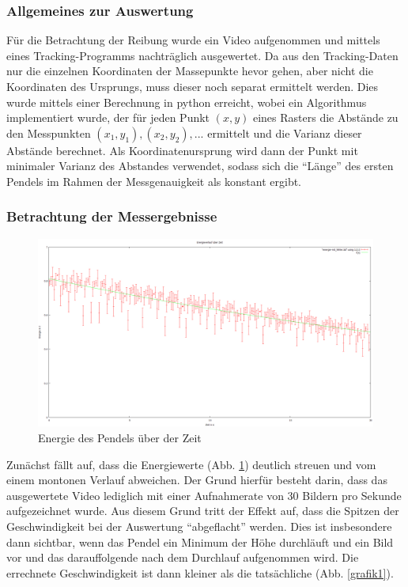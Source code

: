 \subsubsection{Allgemeines zur Auswertung}
Für die Betrachtung der Reibung wurde ein Video aufgenommen und mittels eines Tracking-Programms nachträglich ausgewertet. 
Da aus den Tracking-Daten nur die einzelnen Koordinaten der Massepunkte hevor gehen, aber nicht die Koordinaten des Ursprungs, muss dieser noch separat ermittelt werden. Dies wurde mittels einer Berechnung in python erreicht, wobei ein Algorithmus implementiert wurde, der für jeden Punkt $(x, y)$ eines Rasters die Abstände zu den Messpunkten $(x_1, y_1), (x_2, y_2), ...$ ermittelt und die Varianz dieser Abstände berechnet. Als Koordinatenursprung wird dann der Punkt mit minimaler Varianz des Abstandes verwendet, sodass sich die \enquote{Länge} des ersten Pendels im Rahmen der Messgenauigkeit als konstant ergibt.  

\subsubsection{Betrachtung der Messergebnisse}


\begin{figure}
        \includegraphics[width=.9\textwidth]{images/E_ueber_t.png}
\caption{Energie des Pendels über der Zeit}
\label{E_ueber_t}
\end{figure}

Zunächst fällt auf, dass die Energiewerte (Abb. \ref{E_ueber_t}) deutlich streuen und vom einem montonen Verlauf abweichen. Der Grund hierfür besteht darin, dass das ausgewertete Video lediglich mit einer Aufnahmerate von 30 Bildern pro Sekunde aufgezeichnet wurde. Aus diesem Grund tritt der Effekt auf, dass die Spitzen der Geschwindigkeit bei der Auswertung \enquote{abgeflacht} werden. Dies ist insbesondere dann sichtbar, wenn das Pendel ein Minimum der Höhe durchläuft und ein Bild vor und das darauffolgende nach dem Durchlauf aufgenommen wird. Die errechnete Geschwindigkeit ist dann kleiner als die tatsächliche (Abb. \ref{grafik1}). 

